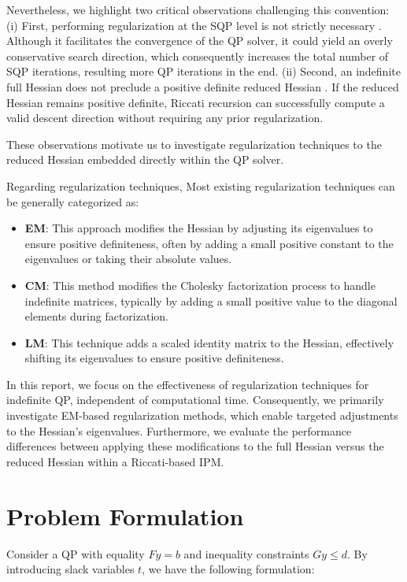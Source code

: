 \documentclass[conference]{IEEEtran}
\begin{document}
Nevertheless, we highlight two critical observations challenging this convention: (i) First, performing regularization at the \ac{SQP} level is not strictly necessary \cite{wachter2006implementation}. 
Although it facilitates the convergence of the \ac{QP} solver, it could yield an overly conservative search direction, 
which consequently increases the total number of \ac{SQP} iterations, resulting more QP iterations in the end.
(ii) Second, an indefinite full Hessian does not preclude a positive definite reduced Hessian \cite{nocedal2006numerical}.
If the reduced Hessian remains positive definite, Riccati recursion can successfully compute a valid descent direction without requiring any prior regularization.

These observations motivate us to investigate regularization techniques to the reduced Hessian embedded directly within the \ac{QP} solver.

Regarding regularization techniques, Most existing regularization techniques \cite{higham1988computing, doi:10.1137/S105262349833266X, nesterov2006cubic} can be generally categorized as:
\begin{itemize}
    \item \textbf{\Ac{EM}}: This approach modifies the Hessian by adjusting its eigenvalues to ensure positive definiteness, often by adding a small positive constant to the eigenvalues or taking their absolute values.
    \item \textbf{\ac{CM}}: This method modifies the Cholesky factorization process to handle indefinite matrices, typically by adding a small positive value to the diagonal elements during factorization.
    \item \textbf{\ac{LM}}: This technique adds a scaled identity matrix to the Hessian, effectively shifting its eigenvalues to ensure positive definiteness.
\end{itemize}

In this report, we focus on the effectiveness of regularization techniques for indefinite QP, independent of computational time.
Consequently, we primarily investigate \ac{EM}-based regularization methods, which enable targeted adjustments to the Hessian's eigenvalues.
Furthermore, we evaluate the performance differences between applying these modifications to the full Hessian versus the reduced Hessian within a Riccati-based IPM.

\section{Problem Formulation}
Consider a QP with equality $Fy=b$ and inequality constraints $Gy \le d$. By introducing slack variables $t$, we have the following formulation:
\end{document}
